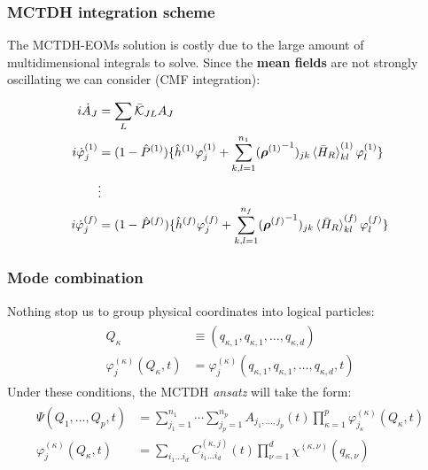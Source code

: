 \documentclass{beamer}
\begin{document}
\begin{frame}
  \frametitle{MCTDH integration scheme}
  The MCTDH-EOMs solution is costly due to the large amount of multidimensional integrals to solve. Since the \textbf{mean fields} are not strongly oscillating we can consider (CMF integration):
  \begin{block}{}
\begin{align}
\begin{split}
i\dot{A}_J &= \sum_L \bar{\mathcal{K}}_{JL}A_J \\
i\dot{\varphi}^{(1)}_j &= (1 - \hat{P}^{(1)})\{\hat{h}^{(1)}\varphi^{(1)}_j + \sum_{k,l=1}^{n_{1}}({\bm{\rho}^{(1)}}^{-1})_{jk}\braket{\bar{H}_R}_{kl}^{(1)}\varphi^{(1)}_l\} \\
           &\vdots \\
i\dot{\varphi}^{(f)}_j &= (1 - \hat{P}^{(f)})\{\hat{h}^{(f)}\varphi^{(f)}_j + \sum_{k,l=1}^{n_{f}}({\bm{\rho}^{(f)}}^{-1})_{jk}\braket{\bar{H}_R}_{kl}^{(f)}\varphi^{(f)}_l\}  
\label{mctdh_eom_mod_dec}
\end{split}	
\end{align}
\end{block}
  
\end{frame}
\begin{frame}
  \frametitle{Mode combination}
  Nothing stop us to group physical coordinates into logical particles:
\begin{align}
\begin{split}
	Q_{\kappa} &\equiv (q_{\kappa,1}, q_{\kappa,1}, \ldots, q_{\kappa,d}) \\
	\varphi_{j}^{(\kappa)}(Q_{\kappa}, t) &= \varphi_{j}^{(\kappa)}(q_{\kappa,1}, q_{\kappa,1}, \ldots, q_{\kappa,d}, t)
\end{split}
\end{align}
Under these conditions, the MCTDH \emph{ansatz} will take the form:
\begin{align}
  \begin{split}
    \Psi(Q_1,\ldots, Q_p, t) &= \sum^{n_1}_{j_1=1}\cdots\sum^{n_p}_{j_p=1}A_{j_1,\ldots,j_p}(t)\prod^{p}_{\kappa=1}\varphi^{(\kappa)}_{j_{\kappa}}(Q_{\kappa}, t) \\
	\varphi_{j}^{(\kappa)}(Q_{\kappa}, t) &= \sum_{i_1 \ldots i_d} C^{(\kappa, j)}_{i_1 \ldots i_d}(t)\prod^{d}_{\nu=1}
	\chi^{(\kappa, \nu)}(q_{\kappa, \nu})
  \end{split}
	\label{mctdh_antz_mc}
\end{align}
  
\end{frame}
\end{document}
